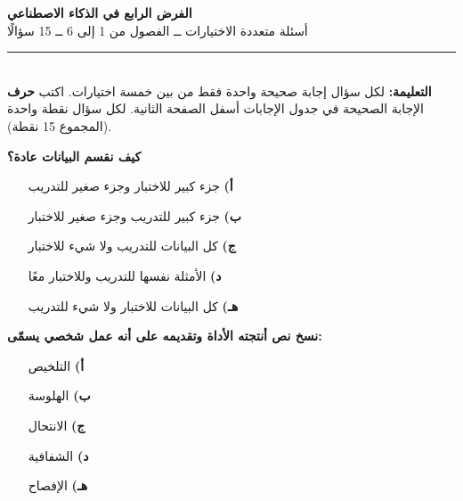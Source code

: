 \documentclass[11pt,a4paper]{article}
\begin{document}
\begin{center}
{\Large\khatt\textbf{الفرض الرابع في الذكاء الاصطناعي}}\\[2pt]
{\normalsize أسئلة متعددة الاختيارات ــ الفصول من 1 إلى 6 ــ 15 سؤالًا}
\end{center}
\vspace{-4pt}\rule{\textwidth}{0.6pt}\\
{\small\textbf{التعليمة:} لكل سؤال إجابة صحيحة واحدة فقط من بين خمسة اختيارات.
اكتب \textbf{حرف} الإجابة الصحيحة في جدول الإجابات أسفل الصفحة الثانية.
لكل سؤال نقطة واحدة (المجموع 15 نقطة).}
\vspace{-2pt}
\begin{multicols}{2}

\noindent\begin{minipage}{\linewidth}
\hangindent=0.7cm\textbf{كيف نقسم البيانات عادة؟}
\begin{itemize}[leftmargin=0.95cm, labelsep=4pt, itemsep=0pt, topsep=2pt, parsep=0pt]
  \item[\textbf{أ)}] جزء كبير للاختبار وجزء صغير للتدريب
  \item[\textbf{ب)}] جزء كبير للتدريب وجزء صغير للاختبار
  \item[\textbf{ج)}] كل البيانات للتدريب ولا شيء للاختبار
  \item[\textbf{د)}] الأمثلة نفسها للتدريب وللاختبار معًا
  \item[\textbf{هـ)}] كل البيانات للاختبار ولا شيء للتدريب
\end{itemize}
\end{minipage}\par\vspace{7pt plus 4pt}
\noindent\begin{minipage}{\linewidth}
\hangindent=0.7cm\textbf{نسخ نص أنتجته الأداة وتقديمه على أنه عمل شخصي يسمّى:}
\begin{itemize}[leftmargin=0.95cm, labelsep=4pt, itemsep=0pt, topsep=2pt, parsep=0pt]
  \item[\textbf{أ)}] التلخيص
  \item[\textbf{ب)}] الهلوسة
  \item[\textbf{ج)}] الانتحال
  \item[\textbf{د)}] الشفافية
  \item[\textbf{هـ)}] الإفصاح
\end{itemize}
\end{minipage}\par\vspace{7pt plus 4pt}

\end{multicols}
\end{document}
